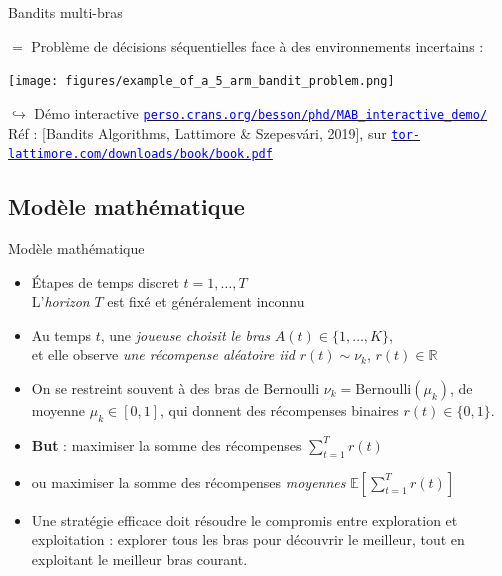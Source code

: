 \documentclass[11pt,french,ignorenonframetext,]{beamer}
\begin{document}
\begin{frame}{Bandits multi-bras}

  $=$ Problème de décisions séquentielles face à des environnements incertains :

  \begin{center}
    \texttt{[image: figures/example\_of\_a\_5\_arm\_bandit\_problem.png]}
  \end{center}

  \begin{tiny}
  $\hookrightarrow$ Démo interactive
    \href{https://perso.crans.org/besson/phd/MAB_interactive_demo/}{\textcolor{blue}{\texttt{perso.crans.org/besson/phd/MAB\_interactive\_demo/}}}\\
    Réf : [Bandits Algorithms, Lattimore \& Szepesv{\'a}ri, 2019],
    sur \href{https://tor-lattimore.com/downloads/book/book.pdf}{\textcolor{blue}{\texttt{tor-lattimore.com/downloads/book/book.pdf}}}
  \end{tiny}

\end{frame}


\subsection{\hfill{}Modèle mathématique\hfill{}}

\begin{frame}{Modèle mathématique}

\begin{itemize}
  \item
  Étapes de temps discret $t = 1, \dots, T$\\
  L'\emph{horizon} $T$ est fixé et généralement inconnu

  \item
  Au temps $t$, une \emph{joueuse choisit le bras} $A(t)\in\{1,\dots,K\}$,\\
  et elle observe \emph{une récompense aléatoire iid} $r(t) \sim \nu_k$, $r(t)\in\mathbb{R}$

  \pause
  \item
  On se restreint souvent à des bras de Bernoulli $\nu_k = \mathrm{Bernoulli}(\mu_k)$, de moyenne $\mu_k\in[0,1]$,
  qui donnent des récompenses binaires $r(t) \in\{0,1\}$.

  \pause
  \item
  \textbf{But} : maximiser la somme des récompenses $\sum\limits_{t=1}^T r(t)$

  \item
  ou \alert{maximiser la somme des récompenses \emph{moyennes} $\mathbb{E}\left[ \sum\limits_{t=1}^T r(t) \right]$}

  \pause
  \item
  Une stratégie efficace doit résoudre le \alert{compromis entre exploration et exploitation} :
  explorer tous les bras pour découvrir le meilleur,
  tout en exploitant le meilleur bras courant.
\end{itemize}

\end{frame}
\end{document}
